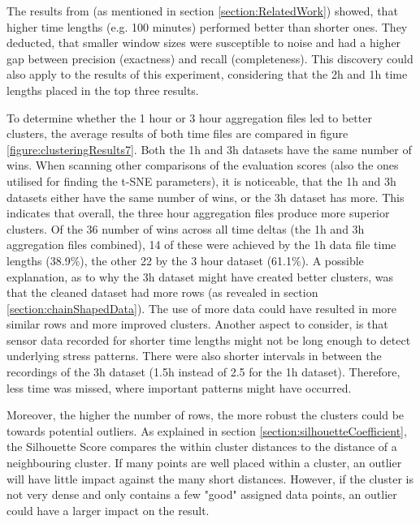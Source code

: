 The results from \textcite{AboutToEat2016Rahman} (as mentioned in section \ref{section:RelatedWork}) showed, that higher time lengths (e.g. 100 minutes) performed better than shorter ones. They deducted, that smaller window sizes were susceptible to noise and had a higher gap between precision (exactness) and recall (completeness). This discovery could also apply to the results of this experiment, considering that the 2h and 1h time lengths placed in the top three results.

To determine whether the 1 hour or 3 hour aggregation files led to better clusters, the average results of both time files are compared in figure \ref{figure:clusteringResults7}. Both the 1h and 3h datasets have the same number of wins. When scanning other comparisons of the evaluation scores (also the ones utilised for finding the t-SNE parameters), it is noticeable, that the 1h and 3h datasets either have the same number of wins, or the 3h dataset has more. This indicates that overall, the three hour aggregation files produce more superior clusters. Of the 36 number of wins across all time deltas (the 1h and 3h aggregation files combined), 14 of these were achieved by the 1h data file time lengths (38.9\%), the other 22 by the 3 hour dataset (61.1\%). A possible explanation, as to why the 3h dataset might have created better clusters, was that the cleaned dataset had more rows (as revealed in section \ref{section:chainShapedData}). The use of more data could have resulted in more similar rows and more improved clusters. Another aspect to consider, is that sensor data recorded for shorter time lengths might not be long enough to detect underlying stress patterns. There were also shorter intervals in between the recordings of the 3h dataset (1.5h instead of 2.5 for the 1h dataset). Therefore, less time was missed, where important patterns might have occurred.

Moreover, the higher the number of rows, the more robust the clusters could be towards potential outliers. As explained in section \ref{section:silhouetteCoefficient}, the Silhouette Score compares the within cluster distances to the distance of a neighbouring cluster. If many points are well placed within a cluster, an outlier will have little impact against the many short distances. However, if the cluster is not very dense and only contains a few "good" assigned data points, an outlier could have a larger impact on the result.

